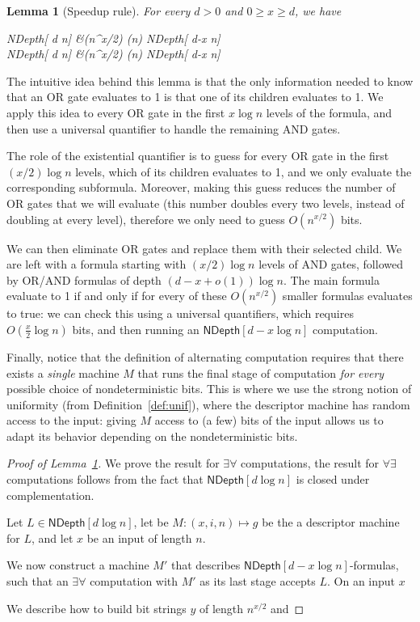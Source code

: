 \documentclass[a4paper, 11pt]{article}
\theoremstyle{plain}
\newtheorem{lemma}[theorem]{Lemma}
\theoremstyle{definition}
\theoremstyle{remark}
\newcommand{\ND}{\textsf{NDepth}}%
\newcommand{\NDL}[1]{\ND[ #1 \log n]}%
\newcommand{\todohere}{\todo[inline]{TODO}}%
\begin{document}
\begin{lemma}[Speedup rule]\label{lemma:speedup}
	For every $d > 0$ and $0 \ge x \ge d$, we have
	\begin{flalign*}
	\NDL{d} &\subseteq (\exists n^{x/2}) (\forall {}\log n) \NDL{d-x}\\
	\NDL{d} &\subseteq (\forall n^{x/2}) (\exists {}\log n) \NDL{d-x}
	\end{flalign*}
\end{lemma}

The intuitive idea behind this lemma is that the only information needed to know that an OR gate evaluates
to 1 is that one of its children evaluates to 1. 
We apply this idea to every OR gate in the first $x \log n$ levels of the formula,
and then use a universal quantifier to handle the remaining AND gates.

The role of the existential quantifier is to guess for every OR gate in the first $(x/2)\log n$ levels,
which of its children evaluates to 1, and we only evaluate the corresponding subformula.
Moreover, making this guess reduces the number of OR gates that we will evaluate
(this number doubles every two levels, instead of doubling at every level), 
therefore we only need to guess $O(n^{x/2})$ bits. 

We can then eliminate OR gates and replace them with their selected child.
We are left with a formula starting with $(x/2)\log n$ levels of AND gates, 
followed by OR/AND formulas of depth $(d-x + o(1)) \log n$.
The main formula evaluate to 1 if and only if for every of these $O(n^{x/2})$
smaller formulas evaluates to true: 
we can check this using a universal quantifiers, 
which requires $O(\frac{x}{2}\log n)$ bits, and then running an $\NDL{d-x}$ computation.

Finally, notice that the definition of alternating computation
requires that there exists a \textit{single} machine $M$ that runs the
final stage of computation \textit{for every} possible choice of nondeterministic bits.
This is where we use the strong notion of uniformity (from Definition~\ref{def:unif}), where the descriptor machine
has random access to the input: giving $M$ access to (a few) bits of the input
allows us to adapt its behavior depending on the nondeterministic bits. 

\begin{proof}[Proof of Lemma~\ref{lemma:speedup}]
	We prove the result for $\exists\forall$ computations, 
	the result for $\forall\exists$ computations follows from the fact that $\NDL{d}$ is closed
	under complementation.
	
	Let $L\in\NDL{d}$, let be $M : (x,i,n) \mapsto g$ be the a descriptor machine for $L$,
	and let $x$ be an input of length $n$.
	
	We now construct a machine $M'$ that describes $\NDL{d-x}$-formulas,
	such that an $\exists\forall$ computation with $M'$ as its last stage accepts $L$.
	On an input $x$

	We describe how to build bit strings $y$ of length $n^{x/2}$ and
	\todohere 
\end{proof}
\end{document}
